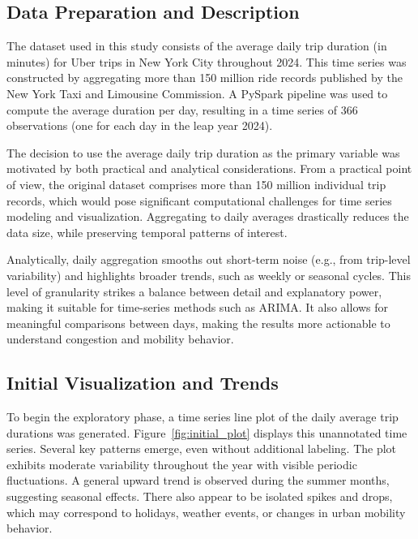 \documentclass{article}
\begin{document}
\subsection{Data Preparation and Description}
The dataset used in this study consists of the average daily trip duration (in minutes) for Uber trips in New York City throughout 2024. This time series was constructed by aggregating more than 150 million ride records published by the New York Taxi and Limousine Commission. A PySpark pipeline was used to compute the average duration per day, resulting in a time series of 366 observations (one for each day in the leap year 2024).

The decision to use the average daily trip duration as the primary variable was motivated by both practical and analytical considerations. From a practical point of view, the original dataset comprises more than 150 million individual trip records, which would pose significant computational challenges for time series modeling and visualization. Aggregating to daily averages drastically reduces the data size, while preserving temporal patterns of interest. 

Analytically, daily aggregation smooths out short-term noise (e.g., from trip-level variability) and highlights broader trends, such as weekly or seasonal cycles. This level of granularity strikes a balance between detail and explanatory power, making it suitable for time-series methods such as ARIMA. It also allows for meaningful comparisons between days, making the results more actionable to understand congestion and mobility behavior.


\subsection{Initial Visualization and Trends}
To begin the exploratory phase, a time series line plot of the daily average trip durations was generated. Figure~\ref{fig:initial_plot} displays this unannotated time series. Several key patterns emerge, even without additional labeling. The plot exhibits moderate variability throughout the year with visible periodic fluctuations. A general upward trend is observed during the summer months, suggesting seasonal effects. There also appear to be isolated spikes and drops, which may correspond to holidays, weather events, or changes in urban mobility behavior.
\end{document}
